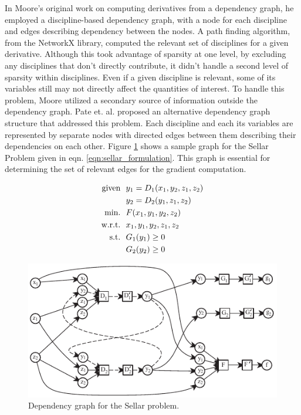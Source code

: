 \documentclass[]{aiaa-tc} %
\newcommand{\txt}{\textrm}
\begin{document}
    In Moore's original work on computing derivatives from a dependency graph, he employed
    a discipline-based dependency graph, with a node for each discipline and edges describing
    dependency between the nodes. A path finding algorithm, from the NetworkX library\cite{hagberg-2008-exploring},
    computed the relevant set of disciplines for a given derivative. Although this took advantage of sparsity at
    one level, by excluding any disciplines that don't directly contribute, it didn't handle a second level of sparsity
    within disciplines. Even if a given discipline is relevant, some of its variables still may not 
    directly affect the quantities of interest. To handle this problem, Moore utilized a secondary source of information 
    outside the dependency graph. Pate et. al. proposed an alternative dependency graph
    structure that addressed this problem\cite{graph_problem2013}. Each discipline and each its variables are
    represented by separate nodes with directed edges between them describing their dependencies on each other.
    Figure \ref{fig:sellar_graph} shows a sample graph for the Sellar Problem \cite{AIAA:sellar}
    given in eqn. \ref{eqn:sellar_formulation}. This graph is essential for determining the set of relevant edges 
    for the gradient computation.

    \begin{align}
        \txt{given} & \ \ y_1 = D_1(x_1,y_2,z_1,z_2) \notag
        \\      & \ \ y_2 = D_2(y_1,z_1,z_2) \notag
        \\\txt{min.} &\ \ F(x_1,y_1,y_2,z_2) \notag
        \\\txt{w.r.t.} & \ \ x_1,y_1,y_2,z_1,z_2 \notag
        \\\txt{s.t.} & \ \ G_1(y_1) \geq 0 \notag
        \\     & \ \ G_2(y_2) \geq 0
        \label{eqn:sellar_formulation}
    \end{align}

    \begin{figure}[!htb]\begin{center}
      \includegraphics[width=.8\textwidth]{images/sellar_cycles}
      \caption{ Dependency graph for the Sellar problem. \label{fig:sellar_graph}}
    \end{center}\end{figure}
\end{document}
